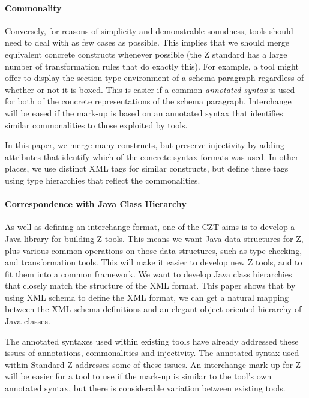 \documentclass{llncs}  %
\begin{document}
\paragraph{Commonality}
Conversely, for reasons of simplicity and demonstrable soundness, 
tools should need to deal with as few cases as possible.  This implies
that we should merge equivalent concrete constructs whenever possible
(the Z standard has a large number of transformation rules that do
exactly this).
For example, a tool might offer to display the section-type environment
of a schema paragraph regardless of whether or not it is boxed.
This is easier if a common \textit{annotated syntax} is used
for both of the concrete representations of the schema paragraph.
Interchange will be eased if the mark-up is based on an annotated syntax
that identifies similar commonalities to those exploited by tools.

In this paper, we merge many constructs, but preserve injectivity
by adding attributes that identify which of the concrete syntax formats
was used.  In other places, we use distinct XML tags for similar
constructs, but define these tags using type hierarchies that reflect 
the commonalities. 

\paragraph{Correspondence with Java Class Hierarchy}
As well as defining an interchange format, one of the CZT 
aims is to develop a Java library for building Z tools.  
This means we want Java data structures for Z, plus various
common operations on those data structures, such as type checking,
and transformation tools.  This will make it easier to develop new
Z tools, and to fit them into a common framework.
We want to develop Java class hierarchies
that closely match the structure of the XML format.  
This paper shows that by using XML schema to define the XML format,
we can get a natural mapping between the XML schema definitions and
an elegant object-oriented hierarchy of Java classes.

\vspace{1.5ex}

The annotated syntaxes used within existing tools have already
addressed these issues of annotations, commonalities and injectivity.
The annotated syntax used within Standard Z addresses some of these issues.
An interchange mark-up for Z will be easier for a tool to use
if the mark-up is similar to the tool's own annotated syntax,
but there is considerable variation between existing tools. 
\end{document}
